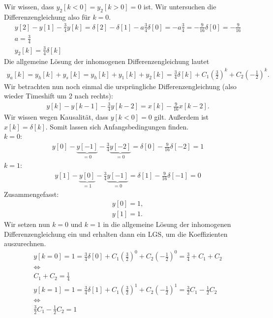 \documentclass[11pt,a4paper,DIV=12]{scrartcl}
\begin{document}
%
Wir wissen, dass $y_2[k<0]=y_2[k>0]=0$ ist. Wir untersuchen die 
Differenzengleichung also für $k=0$.
%
%
\begin{gather}
	y[2]-y[1]-\frac{3}{4}y[k]=\delta[2]-\delta[1]-a\frac{3}{4}\delta[0]=-a\frac{3}{4}=-\frac{9}{16}\delta[0]=-\frac{9}{16}\\
	a = \frac{3}{4}\\
	y_2[k]=\frac{3}{4}\delta[k]
\end{gather}
%
%
Die allgemeine Lösung der inhomogenen Differenzengleichung lautet
%
\begin{gather}
	y_a[k]=y_h[k]+y_s[k]=y_h[k]+y_1[k]+y_2[k]=
	\frac{3}{4}\delta[k]+C_1\left(\frac{3}{2}\right)^k+C_2\left(-\frac{1}{2}\right)^k.
\end{gather}
%
Wir betrachten nun noch einmal die ursprüngliche Differenzengleichung 
(also wieder Timeshift um 2 nach rechts):
%
\begin{gather}
	y[k]-y[k-1]-\frac{3}{4}y[k-2]=x[k]-\frac{9}{16}x[k-2].
\end{gather}
%
Wir wissen wegen Kausalität, dass $y[k<0]=0$ gilt. 
%
Außerdem ist $x[k]=\delta[k]$. Somit lassen sich Anfangsbedingungen finden.\\
%
$k=0$:
%
\begin{gather}
	y[0]-\underbrace{y[-1]}_{=0}-\frac{3}{4}\underbrace{y[-2]}_{=0}=\delta[0]-\frac{9}{16}\delta[-2]=1
\end{gather}
%
$k=1$:
%
\begin{gather}
	y[1]-\underbrace{y[0]}_{=1}-\frac{3}{4}\underbrace{y[-1]}_{=0}=\delta[1]-\frac{9}{16}\delta[-1]=0
\end{gather}
%
Zusammengefasst:
%
\begin{gather}
	y[0]=1,\\
	y[1]=1.
\end{gather}
%
Wir setzen nun $k=0$ und $k=1$ in die allgemeine Lösung der inhomogenen 
Differenzengleichung ein und erhalten dann ein LGS, um die Koeffizienten 
auszurechnen.
%
%
\begin{gather}
	y[k=0]=1=\frac{3}{4}\delta[0]+C_1\left(\frac{3}{2}\right)^0+C_2\left(-\frac{1}{2}\right)^0=\frac{3}{4}+C_1+C_2\\
	\Longleftrightarrow\nonumber \\
	C_1+C_2=\frac{1}{4}\\
	y[k=1]=1=\frac{3}{4}\delta[1]+C_1\left(\frac{3}{2}\right)^1+C_2\left(-\frac{1}{2}\right)^1=\frac{3}{2}C_1-\frac{1}{2}C_2\\
	\Longleftrightarrow\nonumber\\
	\frac{3}{2}C_1-\frac{1}{2}C_2=1
\end{gather}
\end{document}
